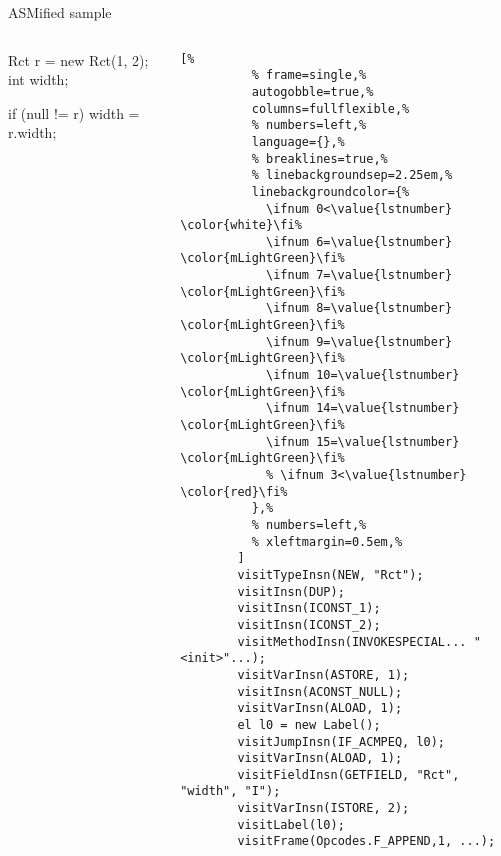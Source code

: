 \begin{frame}[fragile]{ASMified sample}
  \begin{columns}
    \begin{column}{0.35\textwidth}
      \begin{Java}[%
          linebackgroundcolor={%
            \ifnum 0<\value{lstnumber} \color{white}\fi%
            \ifnum 4=\value{lstnumber} \color{mLightGreen}\fi%
          },%
        ]
        Rct r = new Rct(1, 2);
        int width;

        if (null != r)
            width = r.width;
      \end{Java}
    \end{column}
    \begin{column}{0.60\textwidth}
      \small
      \begin{lstlisting}[%
          % frame=single,%
          autogobble=true,%
          columns=fullflexible,%
          % numbers=left,%
          language={},%
          % breaklines=true,%
          % linebackgroundsep=2.25em,%
          linebackgroundcolor={%
            \ifnum 0<\value{lstnumber} \color{white}\fi%
            \ifnum 6=\value{lstnumber} \color{mLightGreen}\fi%
            \ifnum 7=\value{lstnumber} \color{mLightGreen}\fi%
            \ifnum 8=\value{lstnumber} \color{mLightGreen}\fi%
            \ifnum 9=\value{lstnumber} \color{mLightGreen}\fi%
            \ifnum 10=\value{lstnumber} \color{mLightGreen}\fi%
            \ifnum 14=\value{lstnumber} \color{mLightGreen}\fi%
            \ifnum 15=\value{lstnumber} \color{mLightGreen}\fi%
            % \ifnum 3<\value{lstnumber} \color{red}\fi%
          },%
          % numbers=left,%
          % xleftmargin=0.5em,%
        ]
        visitTypeInsn(NEW, "Rct");
        visitInsn(DUP);
        visitInsn(ICONST_1);
        visitInsn(ICONST_2);
        visitMethodInsn(INVOKESPECIAL... "<init>"...);
        visitVarInsn(ASTORE, 1);
        visitInsn(ACONST_NULL);
        visitVarInsn(ALOAD, 1);
        el l0 = new Label();
        visitJumpInsn(IF_ACMPEQ, l0);
        visitVarInsn(ALOAD, 1);
        visitFieldInsn(GETFIELD, "Rct", "width", "I");
        visitVarInsn(ISTORE, 2);
        visitLabel(l0);
        visitFrame(Opcodes.F_APPEND,1, ...);
      \end{lstlisting}
    \end{column}
  \end{columns}
\end{frame}


